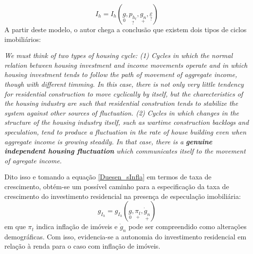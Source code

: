 \begin{equation}
\label{Duesen_sInfla}
I_h = I_h(\underset{0}{g}, \underset{?}{p_{h_t}}, \underset{+}{g_n}, \underset{?}{\varepsilon})
\end{equation}
A partir deste modelo, o autor chega a conclusão que existem dois tipos de ciclos imobiliários:
\begin{citacao}
\textit{We must think of two types of housing cycle: (1) Cycles in which the normal relation between housing investment and income movements operate and  in which housing investment tends to follow the path of movement of aggregate income, though with different timming.
In this case, there is not only very little tendency for residential construction to move cyclically by itself, but the charecteristics of the housing industry are such that residential constrution tends to  stabilize the system against other sources of fluctuation.
(2) Cycles in which changes in the structure of the housing industry itself, such as wartime construction backlogs and speculation, tend to produce a fluctuation in the rate of house building even when aggregate income is growing steadily. 
In that case, there is a \textbf{genuine independent housing fluctuation} which communicates itself to the movement of agregate income.}
\cite[p.~164. grifos adicionados]{duesenberry_investment_1958}
\end{citacao}
Dito isso e tomando a equação \ref{Duesen_sInfla} em termos de taxa de crescimento, obtém-se um possível caminho para a especificação da taxa de crescimento do investimento residencial na presença de especulação imobiliária:
\begin{equation}
\label{gZ_Duesenberry}
g_{I_h} = g_{I_h}(\underset{0}{g}, \underset{+}{\pi_t}, \underset{+}{\dot g_n})
\end{equation}
em que $\pi_t$ indica inflação de imóveis e $\dot g_n$ pode ser compreendido como alterações demográficas.
Com isso, evidencia-se a autonomia do investimento residencial em relação à renda para o caso com inflação de imóveis.


